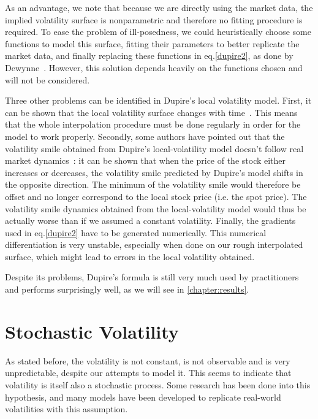 As an advantage, we note that because we are directly using the market data, the implied volatility surface is nonparametric and therefore no fitting procedure is required. To ease the problem of ill-posedness, we could heuristically choose some functions to model this surface, fitting their parameters to better replicate the market data, and finally replacing these functions in eq.\eqref{dupire2}, as done by Dewynne~\citep{dewynne}. However, this solution depends heavily on the functions chosen and will not be considered.



Three other problems can be identified in Dupire's local volatility model.
First, it can be shown that the local volatility surface changes with time~\citep{Wilmott}. This means that the whole interpolation procedure must be done regularly in order for the model to work properly.
Secondly, some authors have pointed out that the volatility smile obtained from Dupire's local-volatility model doesn't follow real market dynamics~\citep{Hagan}: it can be shown that when the price of the stock either increases or decreases, the volatility smile predicted by Dupire's model shifts in the opposite direction. The minimum of the volatility smile would therefore be offset and no longer correspond to the local stock price (i.e. the spot price). The volatility smile dynamics obtained from the local-volatility model would thus be actually worse than if we assumed a constant volatility.
Finally, the gradients used in eq.\eqref{dupire2} have to be generated numerically. This numerical differentiation is very unstable, especially when done on our rough interpolated surface, which might lead to errors in the local volatility obtained.

Despite its problems, Dupire's formula is still very much used by practitioners and performs surprisingly well, as we will see in \autoref{chapter:results}.



\section{Stochastic Volatility}
\label{section:stochastic volatility}
As stated before, the volatility is not constant, is not observable and is very unpredictable, despite our attempts to model it. This seems to indicate that volatility is itself also a stochastic process. Some research has been done into this hypothesis, and many models have been developed to replicate real-world volatilities with this assumption.

